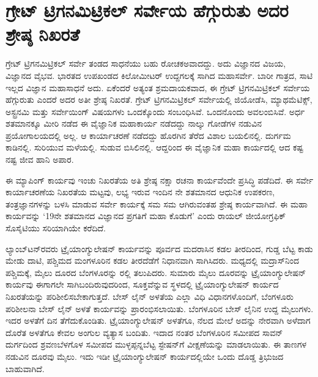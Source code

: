 
\chapter{ಗ್ರೇಟ್​ ಟ್ರಿಗನಮಿಟ್ರಿಕಲ್​ ಸರ್ವೇಯ ಹೆಗ್ಗುರುತು ಅದರ ಶ್ರೇಷ್ಠ ನಿಖರತೆ}

ಗ್ರೇಟ್​ ಟ್ರಿಗನಮಿಟ್ರಿಕಲ್​ ಸರ್ವೇ ತಂಡದ ಸಾಧನೆಯು ಬಹು ರೋಚಕಅವಾದದ್ದು. ಅದು ವಿಜ್ಞಾನದ ವಿಜಯ, ವಿಜ್ಞಾನದ ವೈಭವ. ಭಾರತದ ಉಪಖಂಡದ  ಕಿಲೋಮೀಟರ್​ ಉದ್ದಗಲಕ್ಕೆ ಸಾಗಿದ ಮಹಾಸರ್ವೇ. ಬಾರೀ ಗಾತ್ರದ, ಸಾಟಿ ಇಲ್ಲದ ವಿಜ್ಞಾನ ಮಹಾಸಾಧನೆ ಅದು. ಏಕೆಂದರೆ ಅತ್ಯಂತ ಶ್ರಮದಾಯಕವಾದ, ಈ ಗ್ರೇಟ್​ ಟ್ರಿಗನಮಿಟ್ರಿಕಲ್​ ಸರ್ವೇಯ ಹೆಗ್ಗುರುತು ಎಂದರೆ ಅದರ ಅತೀ ಶ್ರೇಷ್ಠ ನಿಖರತೆ. ಗ್ರೇಟ್​ ಟ್ರಿಗನಮಿಟ್ರಿಕಲ್​ ಸರ್ವೇಯಲ್ಲಿ ಜಿಯೋಡೆಸಿ, ಮ್ಯಾಥಮೆಟಿಕ್ಸ್​, ಅಸ್ಟ್ರನಮಿ ಮತ್ತು ಸರ್ವೇಯಿಂಗ್​ ವಿಷಯಗಳು ಒಂದಕ್ಕೊಂದು ಸಂಬಂಧಿಸಿವೆ. ಒಂದನೊಂದು ಅವಲಂಬಿಸಿವೆ. ಅರ್ಧ ಶತಮಾನಕ್ಕೂ ಮೀರಿ ನಡೆದ ಈ ವೈಜ್ಞಾನಿಕ ಮಹಾಕಾರ್ಯ ನಡೆದದ್ದು ನಾಲ್ಕು ಗೋಡೆಗಳ ನಡುವಿನ ಪ್ರಯೋಗಾಲಯದಲ್ಲಿ ಅಲ್ಲ. ಆ ಕಾರ್ಯಾಚರಣೆ ನಡೆದದ್ದು ಹೊರಗಿನ ತೆರೆದ ವಿಶಾಲ ಬಯಲಿನಲ್ಲಿ. ದುರ್ಗಮ ಕಾಡಿನಲ್ಲಿ. ಸುರಿಯುವ ಮಳೆಯಲ್ಲಿ. ಸುಡುವ ಬಿಸಿಲಿನಲ್ಲಿ. ಆದ್ದರಿಂದ ಈ ವೈಜ್ಞಾನಿಕ ಮಹಾ ಕಾರ್ಯದಲ್ಲಿ ಆದ ಕಷ್ಟ ನಷ್ಟ ಜೀವ ಹಾನಿ ಅಪಾರ.

ಈ ಮ್ಯಾಪಿಂಗ್​ ಕಾರ್ಯವು ಇಂಚು ನಿಖರತೆಯ ಅತಿ ಶ್ರೇಷ್ಠ ನಕ್ಷಾ ರಚನಾ ಕಾರ್ಯವೆಂದೇ ಪ್ರಸಿದ್ಧಿ ಪಡೆದಿದೆ. ಈ ಸರ್ವೇ ಕಾರ್ಯಾಚರಣೆಯ ನಿಖರತೆಯ ಮಟ್ಟವು, ಲಭ್ಯ ಇರುವ ಇಂದಿನ ನೇ ಶತಮಾನದ ಆಧುನಿಕ ಉಪಕರಣ, ತಂತ್ರಜ್ಞಾನಗಳನ್ನು ಬಳಸಿ ಮಾಡುವ ಸರ್ವೇ ಕಾರ್ಯಕ್ಕೆ ಸಮ ಸಮ ಆಗಿರುವಂತಹ ಶ್ರೇಷ್ಠ ಕಾರ್ಯವಾಗಿದೆ. ಈ ಮಹಾ ಕಾರ್ಯವನ್ನು ‘19ನೇ ಶತಮಾನದ ವಿಜ್ಞಾನದ ಪ್ರಗತಿಗೆ ಮಹಾ ಕೊಡುಗೆ’ ಎಂದು ರಾಯಲ್​ ಜೀಯೋಗ್ರಫಿಕ್​ ಸೊಸೈಟಿಯು ಸರಿಯಾಗಿಯೇ ಕರೆದಿದೆ.

ಲ್ಯಾಂಬ್​ಟನ್​ರವರು ಟ್ರೈಯಾಂಗ್ಯುಲೇಷನ್​ ಕಾರ್ಯವನ್ನು ಪೂರ್ವದ ಮದರಾಸಿನ ಕಡಲ ತೀರದಿಂದ, ಗುಡ್ಡ ಬೆಟ್ಟ ಕಾಡು ಮೇಡು ದಾಟಿ, ಪಶ್ಚಿಮದ ಮಂಗಳೂರಿನ ಕಡಲ ತೀರದೆಡೆಗೆ ನಿಧಾನವಾಗಿ ಸಾಗಿಸಿದರು. ಮಧ್ಯದಲ್ಲಿ ಮದ್ರಾಸ್​ನಿಂದ ಪಶ್ಚಿಮಕ್ಕೆ,  ಮೈಲು ದೂರದ ಬೆಂಗಳೂರನ್ನು  ರಲ್ಲಿ ತಲುಪಿದರು. ಸುಮಾರು  ಮೈಲು ದೂರವನ್ನು ಟ್ರೈಯಾಂಗ್ಯುಲೇಷನ್​ ಕಾರ್ಯವು ಈಗಾಗಲೇ ಸಾಗಿಬಂದಿರುವುದರಿಂದ, ಸೂಕ್ತವೆನ್ನುವ ಸ್ಥಳದಲ್ಲಿ ಟ್ರೈಯಾಂಗ್ಯುಲೇಷನ್​ ಕಾರ್ಯದ ನಿಖರತೆಯನ್ನು ಪರಿಶೀಲಿಸಬೇಕಾಗುತ್ತದೆ. ಬೇಸ್​ ಲೈನ್​ ಅಳತೆಯ ಎಲ್ಲಾ ವಿಧಿ ವಿಧಾನಗಳೊಂದಿಗೆ, ಬೆಂಗಳೂರು ಪರಿಶೀಲನಾ ಬೇಸ್​ ಲೈನ್​ ಅಳತೆ ಕಾರ್ಯವನ್ನು ಪ್ರಾರಂಭಿಸಲಾಯಿತು. ಬೆಂಗಳೂರಿನ ಬೇಸ್​ ಲೈನಿನ ಉದ್ದ  ಮೈಲುಗಳು. ಇದರ ಅಳತೆಗೆ  ದಿನ ತೆಗೆದುಕೊಂಡಿತು. ಟ್ರೈಯಾಂಗ್ಯುಲೇಷನ್​ ಅಳತೆಗೂ, ನೆಲದ ಮೇಲೆ ಅದನ್ನು ನೇರವಾಗಿ ಅಳೆದಾಗ ದೊರೆತ ಅಳತೆಗೂ ಕೇವಲ  ಅಂಗುಲ ವ್ಯತ್ಯಾಸ ಬಂದಿತು. ಇದಾದ ನಂತರ ಬೆಂಗಳೂರಿನ ಸಮೀಪದ ಸಾವನ್​ ದುರ್ಗದಿಂದ ಶ್ರವಣಬೆಳಗೊಳ ಸಮೀಪದ ಮುಳ್ಳಪ್ಪನ್ನಬೆಟ್ಟ ಸ್ಟೇಷನ್​ಗೆ ವೀಕ್ಷಣೆಯನ್ನು ಮಾಡಲಾಯಿತು. ಈ ತಾಣಗಳ ನಡುವಿನ ದೂರವು  ಮೈಲು. ಇದು ಇಡೀ ಟ್ರೈಯಾಂಗ್ಯುಲೇಷನ್​ ಕಾರ್ಯದಲ್ಲಿಯೇ ಒಂದು ದೊಡ್ಡ ತ್ರಿಭುಜದ ಬಾಹುವಾಗಿದೆ.

